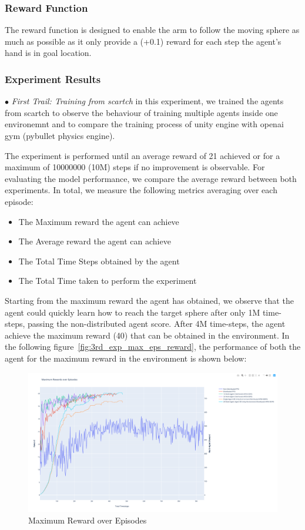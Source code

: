 \subsubsection{Reward Function}

The reward function is designed to enable the arm to follow the moving sphere as much as possible as it only provide a (+0.1) reward for each step the agent's hand is in goal location. 


\subsubsection{Experiment Results}

$\bullet$ \textit{First Trail: Training from scartch} in this experiment, we trained the agents from scartch to observe the behaviour of training multiple agents inside one environemnt and to compare the training process of unity engine with openai gym (pybullet physics engine). 

The experiment is performed until an average reward of 21 achieved or for a maximum of 10000000 (10M) steps if no improvement is observable. For evaluating the model performance, we compare the average reward between both experiments. In total, we measure the following metrics averaging over each episode:
\begin{itemize}
		\item The Maximum reward the agent can achieve
		\item The Average reward the agent can achieve
		\item The Total Time Steps obtained by the agent
		\item The Total Time taken to perform the experiment
\end{itemize}

Starting from the maximum reward the agent has obtained, we observe that the agent could quickly learn how to reach the target sphere after only 1M time-steps, passing the non-distributed agent score. After 4M time-steps, the agent achieve the maximum reward (40) that can be obtained in the environment. In the following figure~\ref{fig:3rd_exp_max_eps_reward}, the performance of both the agent for the maximum reward in the environment is shown below:
\begin{figure}[!htb]
		\centering
		\includegraphics[width=0.8\linewidth]{figures/exps/4th_exp/max_eps_reward.png}
		\caption{Maximum Reward over Episodes}
		\label{fig:4th_exp_max_eps_reward}
\end{figure}

